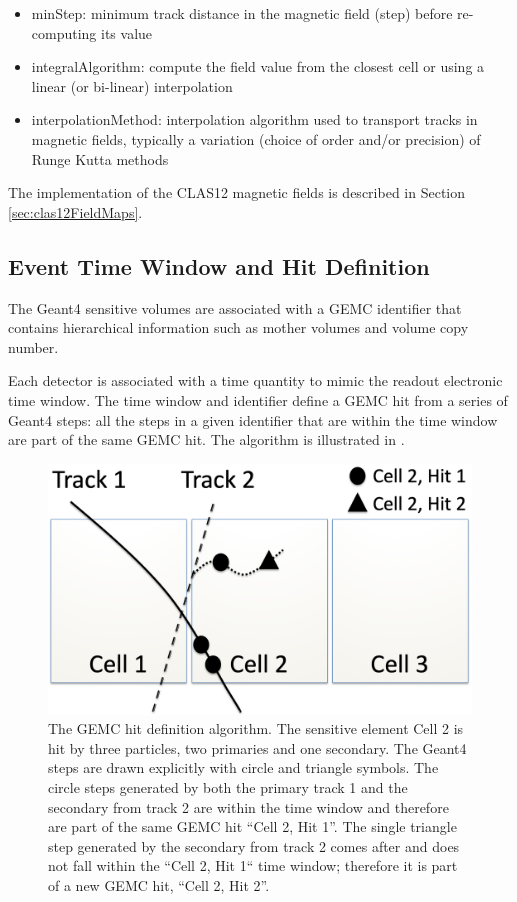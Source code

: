 \begin{itemize}
	\item minStep: minimum track distance in the magnetic field (step) before re-computing its value
	\item integralAlgorithm: compute the field value from the closest cell or using a linear (or bi-linear) interpolation
	\item interpolationMethod: interpolation algorithm used to transport tracks in magnetic fields, typically
		  a variation (choice of order and/or precision) of Runge Kutta \cite{rungeKutta} methods
\end{itemize}

The implementation of the CLAS12 magnetic fields is described in Section \ref{sec:clas12FieldMaps}.

\subsection{Event Time Window and Hit Definition}

The Geant4 sensitive volumes are associated with a GEMC identifier that contains hierarchical information such as mother volumes
and volume copy number.

Each detector is associated with a time quantity to mimic the readout electronic time window. The time window and identifier
define a GEMC hit from a series of Geant4 steps: all the steps in a given identifier that are within the time window
are part of the same GEMC hit. The algorithm is illustrated in .

\begin{figure}
	\centering
	\includegraphics[width=0.99\columnwidth,keepaspectratio]{img/hitDefinition.png}
	\caption{The GEMC hit definition algorithm. The sensitive element Cell 2 is hit by three particles, two primaries and one secondary.
             The Geant4 steps are drawn explicitly with circle and triangle symbols. The circle steps generated by both the primary track 1 and the secondary
             from track 2 are within the time window and therefore are part of the same GEMC hit ``Cell 2, Hit 1''.
             The single triangle step generated by the secondary from track 2 comes after and does not fall within the ``Cell 2, Hit 1``
             time window; therefore it is part of a new GEMC hit, ``Cell 2, Hit 2''.}
	\label{fig:hitDefinition}
\end{figure}

